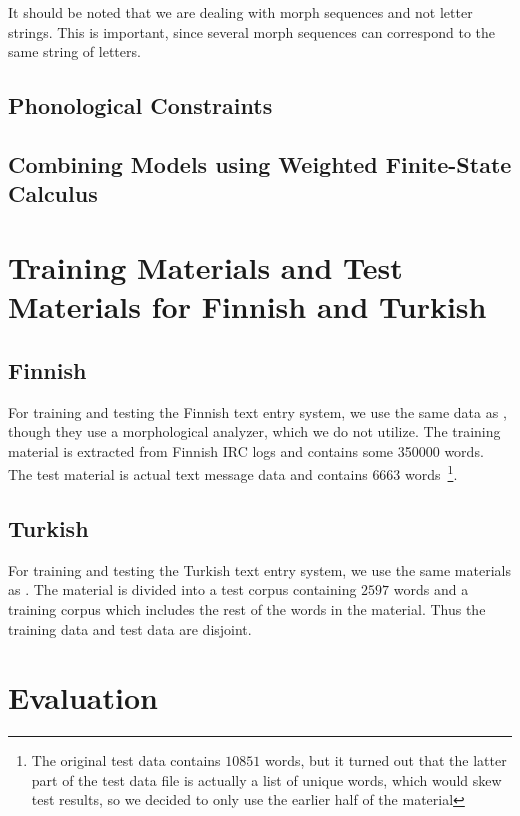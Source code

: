 \documentclass{llncs}
\begin{document}
It should be noted that we are dealing with morph sequences and not
letter strings. This is important, since several morph sequences can
correspond to the same string of letters.

\subsection{Phonological Constraints}

\subsection{Combining Models using Weighted Finite-State Calculus}

\section{Training Materials and Test Materials for Finnish and Turkish}\label{data}

\subsection{Finnish}

For training and testing the Finnish text entry system, we use the
same data as \cite{silfverberg/2011/cla}, though they use a
morphological analyzer, which we do not utilize. The training material is extracted from Finnish IRC logs and contains some 350000 words. The test material is actual text message data and contains $6663$ words~\footnote{The original test data contains $10851$ words, but it turned out that the latter part of the test data file is actually a list of unique words, which would skew test results, so we decided to only use the earlier half of the material}. 

\subsection{Turkish}

For training and testing the Turkish text entry system, we use the
same materials as \cite{Tantug:2010}. The material is divided into a
test corpus containing $2597$ words and a training corpus which
includes the rest of the words in the material. Thus the training data
and test data are disjoint.

\section{Evaluation}\label{evaluation}
\end{document}
